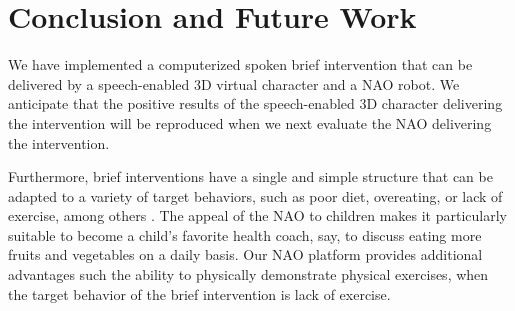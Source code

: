 \documentclass[letterpaper]{article}
\begin{document}

\section*{Conclusion and Future Work} 

We have implemented a computerized spoken brief intervention that can be delivered by a speech-enabled 3D virtual character and a NAO robot.  We anticipate that the positive results of the speech-enabled 3D character delivering the intervention will be reproduced when we next evaluate the NAO delivering the intervention.

Furthermore, brief interventions have a single and simple structure that can be adapted to a variety of target behaviors, such as poor diet, overeating, or lack of exercise, among others \cite{Moyer2002}.
The appeal of the NAO to children 
\cite{belpaeme2012multimodal} makes it particularly suitable to become a child's favorite health 
coach, say, to discuss eating more fruits and vegetables on a daily basis. Our NAO platform 
provides additional advantages such the ability to physically demonstrate physical exercises, when the target behavior of the brief intervention is lack of exercise.

       
   
\end{document}
